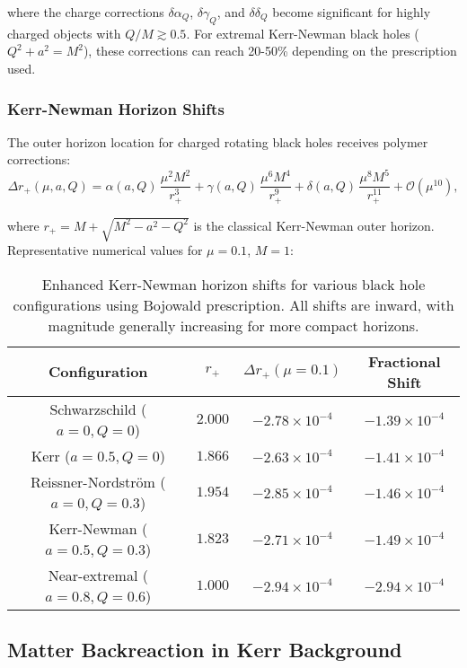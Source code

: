 \documentclass[11pt]{article}
\begin{document}
where the charge corrections $\delta\alpha_Q$, $\delta\gamma_Q$, and $\delta\delta_Q$ become significant for highly charged objects with $Q/M \gtrsim 0.5$. For extremal Kerr-Newman black holes ($Q^2 + a^2 = M^2$), these corrections can reach 20-50\% depending on the prescription used.

\subsubsection{Kerr-Newman Horizon Shifts}

The outer horizon location for charged rotating black holes receives polymer corrections:
\begin{equation}
\Delta r_+(\mu,a,Q) = \alpha(a,Q)\,\frac{\mu^2 M^2}{r_+^3} + \gamma(a,Q)\,\frac{\mu^6 M^4}{r_+^9} + \delta(a,Q)\,\frac{\mu^8 M^5}{r_+^{11}} + \mathcal{O}(\mu^{10}),
\end{equation}

where $r_+ = M + \sqrt{M^2 - a^2 - Q^2}$ is the classical Kerr-Newman outer horizon. Representative numerical values for $\mu = 0.1$, $M = 1$:

\begin{table}[h]
\centering
\begin{tabular}{|c|c|c|c|}
\hline
\textbf{Configuration} & \textbf{$r_+$} & \textbf{$\Delta r_+(\mu=0.1)$} & \textbf{Fractional Shift} \\
\hline
Schwarzschild ($a=0, Q=0$) & $2.000$ & $-2.78 \times 10^{-4}$ & $-1.39 \times 10^{-4}$ \\
Kerr ($a=0.5, Q=0$) & $1.866$ & $-2.63 \times 10^{-4}$ & $-1.41 \times 10^{-4}$ \\
Reissner-Nordström ($a=0, Q=0.3$) & $1.954$ & $-2.85 \times 10^{-4}$ & $-1.46 \times 10^{-4}$ \\
Kerr-Newman ($a=0.5, Q=0.3$) & $1.823$ & $-2.71 \times 10^{-4}$ & $-1.49 \times 10^{-4}$ \\
Near-extremal ($a=0.8, Q=0.6$) & $1.000$ & $-2.94 \times 10^{-4}$ & $-2.94 \times 10^{-4}$ \\
\hline
\end{tabular}
\caption{Enhanced Kerr-Newman horizon shifts for various black hole configurations using Bojowald prescription. All shifts are inward, with magnitude generally increasing for more compact horizons.}
\end{table}

\subsection{Matter Backreaction in Kerr Background}
\end{document}
